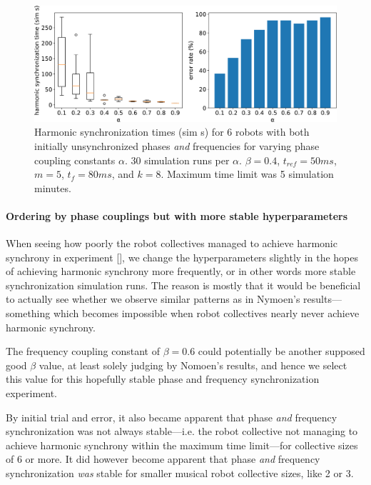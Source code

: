 		\begin{figure}[ht!]
			\centering
			\includegraphics[width=\linewidth]{Assets/DocSegments/Chapters/ExperimentsAndResults/Figures/PerfScores/experiment2_rerun_perfScores.pdf}
			\caption{Harmonic synchronization times (sim s) for 6 robots with both initially unsynchronized phases \textit{and} frequencies for varying phase coupling constants $\alpha$. 30 simulation runs per $\alpha$. $\beta=0.4$, $t_{ref}=50ms$, $m=5$, $t_f=80ms$, and $k=8$. Maximum time limit was 5 simulation minutes.}
			\label{fig:exp2}
		\end{figure}
		
		
		\paragraph{Ordering by phase couplings but with more stable hyperparameters}
		
		When seeing how poorly the robot collectives managed to achieve harmonic synchrony in experiment [], we change the hyperparameters slightly in the hopes of achieving harmonic synchrony more frequently, or in other words more stable synchronization simulation runs. The reason is mostly that it would be beneficial to actually see whether we observe similar patterns as in Nymoen's results—something which becomes impossible when robot collectives nearly never achieve harmonic synchrony.
		
		The frequency coupling constant of $\beta=0.6$ could potentially be another supposed good $\beta$ value, at least solely judging by Nomoen's results, and hence we select this value for this hopefully stable phase and frequency synchronization experiment.
		
		By initial trial and error, it also became apparent that phase \textit{and} frequency synchronization was not always stable—i.e. the robot collective not managing to achieve harmonic synchrony within the maximum time limit—for collective sizes of 6 or more. It did however become apparent that phase \textit{and} frequency synchronization \textit{was} stable for smaller musical robot collective sizes, like 2 or 3.
		
